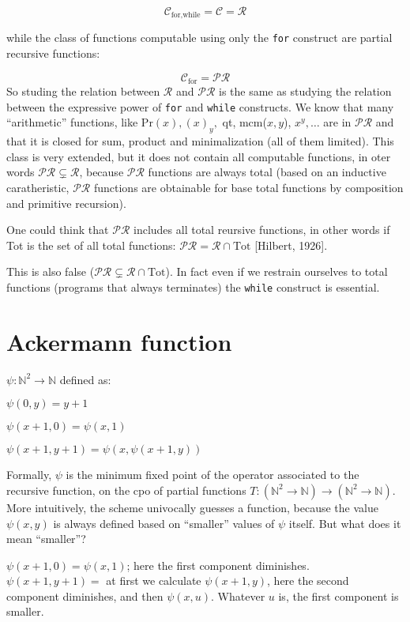 \documentclass{amsbook}
\newcommand{\nat}{\ensuremath{\mathbb{N}}}
\theoremstyle{definition}
\theoremstyle{remark}
\numberwithin{section}{chapter}
\numberwithin{equation}{chapter}
\begin{document}
\[
  \mathcal{C}_{\text{for,while}} = \mathcal{C} = \mathcal{R}
\]

while the class of functions computable using only the \texttt{for}
construct are partial recursive functions:

\[
  \mathcal{C}_{\text{for}} = \mathcal{PR}
\]
So studing the relation between $\mathcal{R}$ and $\mathcal{PR}$ is
the same as studying the relation between the expressive power of
\texttt{for} and \texttt{while} constructs.  We know that many
``arithmetic'' functions, like Pr$(x), (x)_y,$ qt, mcm($x,y$),
$x^y, \dots$ are in $\mathcal{PR}$ and that it is closed for sum,
product and minimalization (all of them limited). This class is very
extended, but it does not contain all computable functions, in oter
words $\mathcal{PR} \subsetneq \mathcal{R}$, because $\mathcal{PR}$
functions are always total (based on an inductive caratheristic,
$\mathcal{PR}$ functions are obtainable for base total functions by
composition and primitive recursion).

One could think that $\mathcal{PR}$ includes all total reursive
functions, in other words if Tot is the set of all total functions:
$\mathcal{PR} = \mathcal{R} \cap \text{Tot}$ [Hilbert, 1926].

This is also false
($\mathcal{PR} \subsetneq \mathcal{R} \cap \text{Tot}$). In fact even
if we restrain ourselves to total functions (programs that always
terminates) the \texttt{while} construct is essential.

\section{Ackermann function}
$ \psi: \nat^2 \rightarrow \nat $ defined as:

$ \psi(0,y) = y+1 $

$ \psi(x+1,0) = \psi(x,1) $

$ \psi(x+1,y+1) = \psi(x, \psi(x+1, y)) $

Formally, $\psi$ is the minimum fixed point of the operator associated
to the recursive function, on the cpo %
of partial functions
$T: (\mathbb{N}^2 \rightarrow \mathbb{N}) \rightarrow (\mathbb{N}^2
\rightarrow \mathbb{N})$. More intuitively, the scheme univocally
guesses a function, because the value $\psi(x,y)$ is always defined
based on ``smaller'' values of $\psi$ itself. But what does it mean
``smaller''?

$\psi(x+1,0) = \psi(x,1)$; here the first component
diminishes. $\psi(x+1,y+1)=$ at first we calculate $\psi(x+1, y)$,
here the second component diminishes, and then $\psi(x,u)$. Whatever
$u$ is, the first component is smaller.
\end{document}
